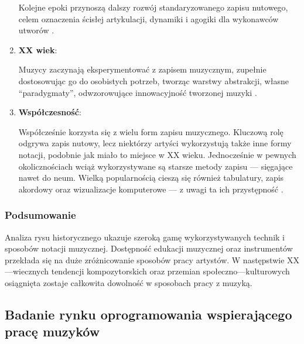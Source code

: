 \begin{enumerate}
	      Kolejne epoki przynoszą dalszy rozwój standaryzowanego zapisu nutowego, celem oznaczenia ścisłej artykulacji, dynamiki i agogiki
	      dla wykonawców utworów \cite{abc}.
	\item \textbf{XX wiek}:

	      Muzycy zaczynają eksperymentować z zapisem muzycznym, zupełnie dostosowując go do osobistych potrzeb, tworząc warstwy abstrakcji,
	      własne \enquote{paradygmaty}, odwzorowujące innowacyjność tworzonej muzyki \cite{atlas2}.
	\item \textbf{Współczesność}:

	      Współcześnie korzysta się z wielu form zapisu muzycznego. Kluczową rolę odgrywa zapis nutowy,
	      lecz niektórzy artyści wykorzystują także inne formy notacji, podobnie jak miało to miejsce w XX wieku.
	      Jednocześnie w pewnych okolicznościach wciąż wykorzystywane są starsze metody zapisu — sięgające nawet do neum.
	      Wielką popularnością cieszą się również tabulatury, zapis akordowy oraz wizualizacje komputerowe — z uwagi ta ich przystępność \cite{modern}.
\end{enumerate}

\subsubsection{Podsumowanie}
Analiza rysu historycznego ukazuje szeroką gamę wykorzystywanych technik i sposobów notacji muzycznej. Dostępność edukacji muzycznej
oraz instrumentów przekłada się na duże zróżnicowanie sposobów pracy artystów. W następstwie XX—wiecznych tendencji kompozytorskich
oraz przemian społeczno—kulturowych osiągnięta zostaje całkowita dowolność w sposobach pracy z muzyką.

\subsection{Badanie rynku oprogramowania wspierającego pracę muzyków}
